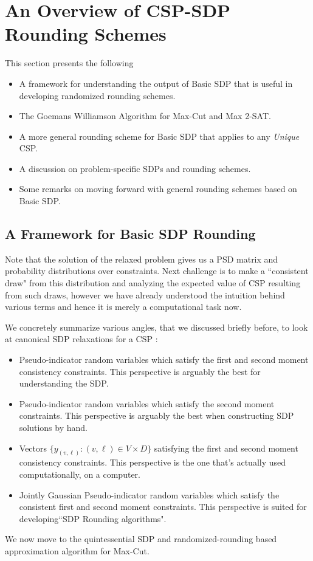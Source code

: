 \section{An Overview of CSP-SDP Rounding Schemes}\label{sec:rounding}
This section presents the following
\begin{itemize}
\item A framework for understanding the output of Basic SDP that is useful in developing randomized rounding schemes. 
\item The Goemans Williamson Algorithm for Max-Cut and Max 2-SAT.
\item A more general rounding scheme for Basic SDP that applies to any \textit{Unique} CSP.
\item A discussion on problem-specific SDPs and rounding schemes.
\item Some remarks on moving forward with general rounding schemes based on Basic SDP.
\end{itemize}

\subsection{A Framework for Basic SDP Rounding} 
Note that the solution of the relaxed problem gives us a PSD matrix and probability distributions over constraints. 
Next challenge is to make a ``consistent draw" from this distribution and analyzing the expected value of CSP resulting from such draws, 
however we have already understood the intuition behind various terms and hence it is merely a computational task now.  

We concretely summarize various angles, that we discussed briefly before, to look at canonical SDP relaxations for a CSP :
\begin{itemize}
\item Pseudo-indicator random variables which satisfy the first and second moment consistency constraints. 
This perspective is arguably the best for understanding the SDP. 
\item Pseudo-indicator random variables which satisfy the second moment constraints. 
This perspective is arguably the best when constructing SDP solutions by hand.
\item Vectors $\{ y_{(v, \ell)} : (v, \ell) \in V \times D \}$ satisfying the first and second moment consistency constraints.  
This perspective is the one that's actually used computationally, on a computer. 
\item Jointly Gaussian Pseudo-indicator random variables which satisfy the consistent first and second moment constraints. 
This perspective is suited for developing``SDP Rounding algorithms". 
\end{itemize}
We now move to the quintessential SDP and randomized-rounding based approximation algorithm for Max-Cut.

